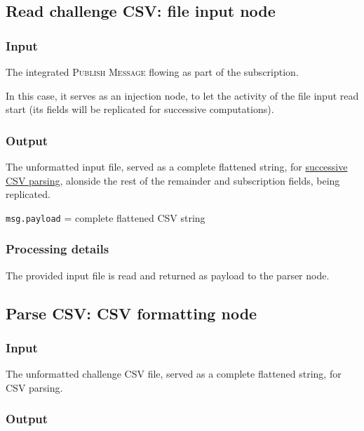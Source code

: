 \documentclass[a4paper,11pt]{article} %
\begin{document}
    \subsection{Read challenge CSV: file input node}\label{subsec:read-challenge-csv:-file-input-node}

    \subsubsection{Input}

    The integrated \textsc{Publish Message} flowing as part of the subscription.

    \smallskip

    In this case, it serves as an injection node, to let the activity of the file input read start (its fields will be replicated for successive computations).

    \subsubsection{Output}

    The unformatted input file, served as a complete flattened string, for \hyperref[subsec:parse-csv:-csv-formatting-node]{successive CSV parsing}, alonside the rest of the remainder and subscription fields, being replicated.

    \smallskip

    \texttt{msg.payload} = complete flattened CSV string

    \subsubsection{Processing details}

    The provided input file is read and returned as payload to the parser node.

    \subsection{Parse CSV: CSV formatting node}\label{subsec:parse-csv:-csv-formatting-node}

    \subsubsection{Input}

    The unformatted challenge CSV file, served as a complete flattened string, for CSV parsing.

    \subsubsection{Output}
\end{document}

